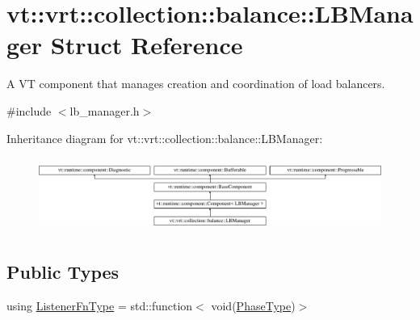 \hypertarget{structvt_1_1vrt_1_1collection_1_1balance_1_1_l_b_manager}{}\section{vt\+:\+:vrt\+:\+:collection\+:\+:balance\+:\+:L\+B\+Manager Struct Reference}
\label{structvt_1_1vrt_1_1collection_1_1balance_1_1_l_b_manager}


A VT component that manages creation and coordination of load balancers.  




{\ttfamily \#include $<$lb\+\_\+manager.\+h$>$}

Inheritance diagram for vt\+:\+:vrt\+:\+:collection\+:\+:balance\+:\+:L\+B\+Manager\+:\begin{figure}[H]
\begin{center}
\leavevmode
\includegraphics[height=2.464246cm]{structvt_1_1vrt_1_1collection_1_1balance_1_1_l_b_manager}
\end{center}
\end{figure}
\subsection*{Public Types}
\begin{DoxyCompactItemize}
\item 
using \hyperlink{structvt_1_1vrt_1_1collection_1_1balance_1_1_l_b_manager_a1bb65b50c7cefb8c139a9f40a83ca18b}{Listener\+Fn\+Type} = std\+::function$<$ void(\hyperlink{namespacevt_a46ce6733d5cdbd735d561b7b4029f6d7}{Phase\+Type})$>$
\end{DoxyCompactItemize}

